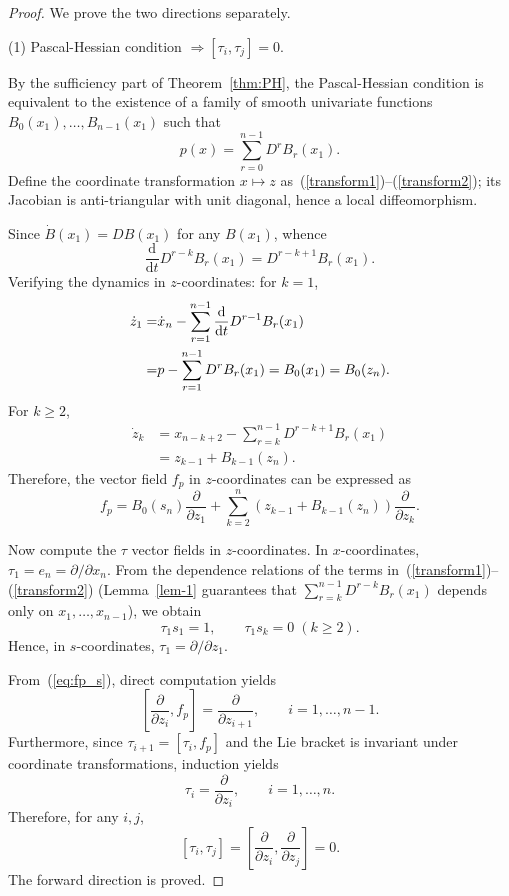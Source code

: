 \documentclass[11pt]{article}
\begin{document}
\begin{proof}
	We prove the two directions separately.
	
	\noindent (1) Pascal-Hessian condition $\Rightarrow [\tau_i,\tau_j]=0$.

	By the sufficiency part of Theorem~\ref{thm:PH}, the Pascal-Hessian condition is equivalent to the existence of a family of smooth univariate functions $B_0(x_1),\ldots,B_{n-1}(x_1)$ such that
	\begin{equation}\label{eq:p_sum}
		p(x)=\sum_{r=0}^{n-1}D^rB_r(x_1).
	\end{equation}
	Define the coordinate transformation $x\mapsto z$ as~(\ref{transform1})--(\ref{transform2}); its Jacobian is anti-triangular with unit diagonal, hence a local diffeomorphism.

	Since $\dot{B}(x_1)=DB(x_1)$ for any $B(x_1)$, whence
	\[
	\frac{\mathrm{d}}{\mathrm{d}t}D^{r-k}B_r(x_1)=D^{r-k+1}B_r(x_1).
	\]
	Verifying the dynamics in $z$-coordinates: for $k=1$,
	\begin{align}
		\dot{z}_1=&\dot{x}_n-\sum_{r=1}^{n-1}\frac{\mathrm{d}}{\mathrm{d}t}D^{r-1}B_r(x_1)\notag\\
		=&p-\sum_{r=1}^{n-1}D^rB_r(x_1)=B_0(x_1)=B_0(z_n).
	\end{align}
	For $k\geq2$,
	\[
	\begin{aligned}
		\dot{z}_k&=x_{n-k+2}-\sum_{r=k}^{n-1}D^{r-k+1}B_r(x_1)\\
		&=z_{k-1}+B_{k-1}(z_n).
	\end{aligned}
	\]
	Therefore, the vector field $f_p$ in $z$-coordinates can be expressed as
	\begin{equation}\label{eq:fp_s}
		f_p=B_0(s_n)\frac{\partial}{\partial z_1}+\sum_{k=2}^{n}\left(z_{k-1}+B_{k-1}(z_n)\right)\frac{\partial}{\partial z_k}.
	\end{equation}

	Now compute the $\tau$ vector fields in $z$-coordinates. In $x$-coordinates, $\tau_1=e_n=\partial/\partial x_n$. From the dependence relations of the terms in~(\ref{transform1})--(\ref{transform2}) (Lemma~\ref{lem-1} guarantees that $\sum_{r=k}^{n-1}D^{r-k}B_r(x_1)$ depends only on $x_1,\ldots,x_{n-1}$), we obtain
	\[
	\tau_1s_1=1,\qquad \tau_1s_k=0\;(k\geq2).
	\]
	Hence, in $s$-coordinates, $\tau_1=\partial/\partial z_1$.

	From~(\ref{eq:fp_s}), direct computation yields
	\[
	\left[\frac{\partial}{\partial z_i},f_p\right]=\frac{\partial}{\partial z_{i+1}},\qquad i=1,\ldots,n-1.
	\]
	Furthermore, since $\tau_{i+1}=[\tau_i,f_p]$ and the Lie bracket is invariant under coordinate transformations, induction yields
	\[
	\tau_i=\frac{\partial}{\partial z_i},\qquad i=1,\ldots,n.
	\]
	Therefore, for any $i,j$,
	\[
	[\tau_i,\tau_j]=\left[\frac{\partial}{\partial z_i},\frac{\partial}{\partial z_j}\right]=0.
	\]
	The forward direction is proved.


\end{proof}
\end{document}

